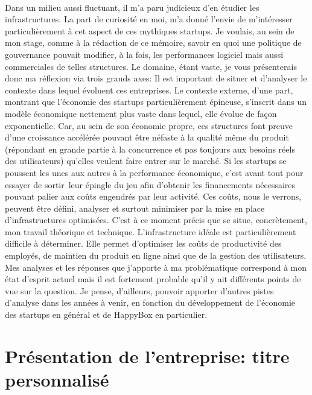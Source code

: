 \documentclass[11pt, a4paper ]{article}
\let\stdsection\section
\renewcommand\section{\newpage\stdsection}
\begin{document}
\begin{spacing}{1.5}
\paragraph{}
Dans un milieu aussi fluctuant, il m'a paru judicieux d'en étudier les infrastructures. La part de curiosité en moi, m'a donné l'envie de m'intéresser particulièrement à cet aspect de ces mythiques startups. Je voulais, au sein de mon stage, comme à la rédaction de ce mémoire, savoir en quoi une politique de gouvernance pouvait modifier, à la fois, les performances logiciel mais aussi commerciales de telles structures. Le domaine, étant vaste, je vous présenterais donc ma réflexion via trois grands axes: 
Il est important de situer et d'analyser le contexte dans lequel évoluent ces entreprises. Le contexte externe, d'une part, montrant que l'économie des startups particulièrement épineuse, s'inscrit dans un modèle économique nettement plus vaste dans lequel, elle évolue de façon exponentielle. Car, au sein de son économie propre, ces structures font preuve d'une croissance accélérée pouvant être néfaste à la qualité même du produit (répondant en grande partie à la concurrence et pas toujours aux besoins réels des utilisateurs) qu'elles veulent faire entrer sur le marché.
Si les startups se poussent les unes aux autres à la performance économique, c'est avant tout pour essayer de sortir leur épingle du jeu afin d'obtenir les financements nécessaires pouvant palier aux coûts engendrés par leur activité. Ces coûts, nous le verrons, peuvent être défini, analyser et surtout minimiser par la mise en place d’infrastructures optimisées.
C'est à ce moment précis que se situe, concrètement, mon travail théorique et technique. L'infrastructure idéale est particulièrement difficile à déterminer. Elle permet d'optimiser les coûts de productivité des employés, de maintien du produit en ligne ainsi que de la gestion des utilisateurs.
Mes analyses et les réponses que j'apporte à ma problématique correspond à mon état d'esprit actuel mais il est fortement probable qu'il y ait différents points de vue sur la question. Je pense, d'ailleurs, pouvoir apporter d'autres pistes d'analyse dans les années à venir, en fonction du développement de l'économie des startups en général et de HappyBox en particulier.






	\section{Présentation de l'entreprise: titre personnalisé} %


\end{spacing}
\end{document}
